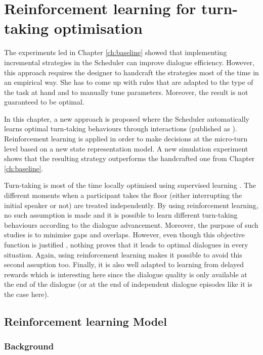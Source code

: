 \chapter{Reinforcement learning for turn-taking optimisation}
\label{ch:rl}

	The experiments led in Chapter \ref{ch:baseline} showed that implementing incremental strategies in the Scheduler can improve dialogue efficiency. However, this approach requires the designer to handcraft the strategies most of the time in an empirical way. She has to come up with rules that are adapted to the type of the task at hand and to manually tune parameters. Moreover, the result is not guaranteed to be optimal.
	
	In this chapter, a new approach is proposed where the Scheduler automatically learns optimal turn-taking behaviours through interactions (published as \cite{Khouzaimi2015b}). Reinforcement learning is applied in order to make decisions at the micro-turn level based on a new state representation model. A new simulation experiment shows that the resulting strategy outperforms the handcrafted one from Chapter \ref{ch:baseline}.

        Turn-taking is most of the time locally optimised using supervised learning \cite{Raux2009,Meena2013}. The different moments when a participant takes the floor (either interrupting the initial speaker or not) are treated independently. By using reinforcement learning, no such assumption is made and it is possible to learn different turn-taking behaviours according to the dialogue advancement. Moreover, the purpose of such studies is to minimise gaps and overlaps. However, even though this objective function is justified \cite{Sacks1974}, nothing proves that it leads to optimal dialogues in every situation. Again, using reinforcement learning makes it possible to avoid this second assuption too. Finally, it is also well adapted to learning from delayed rewards which is interesting here since the dialogue quality is only available at the end of the dialogue (or at the end of independent dialogue episodes like it is the case here).

\section{Reinforcement learning Model}

        \subsection{Background}

